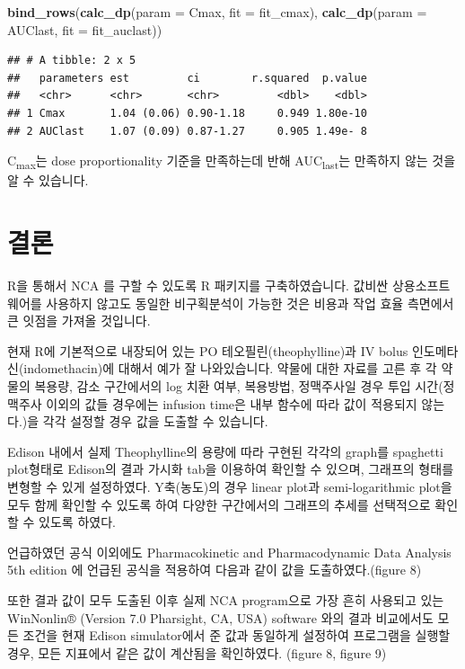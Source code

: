 \documentclass[
  12pt,
]{krantz}
\newenvironment{Shaded}{\begin{snugshade}}{\end{snugshade}}
\newcommand{\DataTypeTok}[1]{\textcolor[rgb]{0.13,0.29,0.53}{#1}}
\newcommand{\KeywordTok}[1]{\textcolor[rgb]{0.13,0.29,0.53}{\textbf{#1}}}
\newcommand{\NormalTok}[1]{#1}
\newcommand{\StringTok}[1]{\textcolor[rgb]{0.31,0.60,0.02}{#1}}
\begin{document}
\begin{Shaded}
\begin{Highlighting}[]
\KeywordTok{bind\_rows}\NormalTok{(}\KeywordTok{calc\_dp}\NormalTok{(}\DataTypeTok{param =} \StringTok{\textquotesingle{}Cmax\textquotesingle{}}\NormalTok{, }\DataTypeTok{fit =}\NormalTok{ fit\_cmax),}
          \KeywordTok{calc\_dp}\NormalTok{(}\DataTypeTok{param =} \StringTok{\textquotesingle{}AUClast\textquotesingle{}}\NormalTok{, }\DataTypeTok{fit =}\NormalTok{ fit\_auclast))}
\end{Highlighting}
\end{Shaded}

\begin{verbatim}
## # A tibble: 2 x 5
##   parameters est         ci        r.squared  p.value
##   <chr>      <chr>       <chr>         <dbl>    <dbl>
## 1 Cmax       1.04 (0.06) 0.90-1.18     0.949 1.80e-10
## 2 AUClast    1.07 (0.09) 0.87-1.27     0.905 1.49e- 8
\end{verbatim}

C\textsubscript{max}는 dose proportionality 기준을 만족하는데 반해 AUC\textsubscript{last}는 만족하지 않는 것을 알 수 있습니다.

\hypertarget{conclusion}{%
\chapter{결론}\label{conclusion}}

R을 통해서 NCA 를 구할 수 있도록 R 패키지를 구축하였습니다. 값비싼 상용소프트웨어를 사용하지 않고도 동일한 비구획분석이 가능한 것은 비용과 작업 효율 측면에서 큰 잇점을 가져올 것입니다.

현재 R에 기본적으로 내장되어 있는 PO 테오필린(theophylline)과 IV bolus 인도메타신(indomethacin)에 대해서 예가 잘 나와있습니다.
약물에 대한 자료를 고른 후 각 약물의 복용량, 감소 구간에서의 log 치환 여부, 복용방법, 정맥주사일 경우 투입 시간(정맥주사 이외의 값들 경우에는 infusion time은 내부 함수에 따라 값이 적용되지 않는다.)을 각각 설정할 경우 값을 도출할 수 있습니다.

Edison 내에서 실제 Theophylline의 용량에 따라 구현된 각각의 graph를 spaghetti plot형태로 Edison의 결과 가시화 tab을 이용하여 확인할 수 있으며, 그래프의 형태를 변형할 수 있게 설정하였다.
Y축(농도)의 경우 linear plot과 semi-logarithmic plot을 모두 함께 확인할 수 있도록 하여 다양한 구간에서의 그래프의 추세를 선택적으로 확인할 수 있도록 하였다.

언급하였던 공식 이외에도 Pharmacokinetic and Pharmacodynamic Data Analysis 5th edition 에 언급된 공식을 적용하여 다음과 같이 값을 도출하였다.(figure 8)

또한 결과 값이 모두 도출된 이후 실제 NCA program으로 가장 흔히 사용되고 있는 WinNonlin® (Version 7.0 Pharsight, CA, USA) software 와의 결과 비교에서도 모든 조건을 현재 Edison simulator에서 준 값과 동일하게 설정하여 프로그램을 실행할 경우, 모든 지표에서 같은 값이 계산됨을 확인하였다. (figure 8, figure 9)
\end{document}
